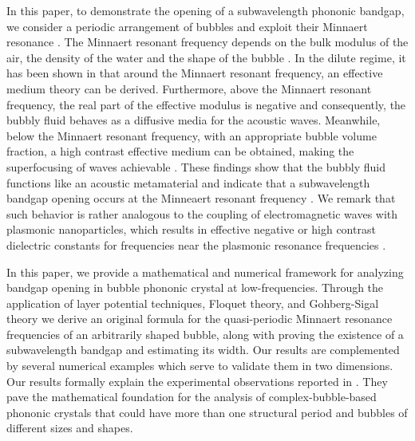 \documentclass[11pt]{article}
\numberwithin{equation}{section}
\newcommand\1{{\ensuremath {\mathds 1} }}
\begin{document}
In this paper, to demonstrate the opening of a subwavelength phononic bandgap, we consider a periodic arrangement of bubbles and exploit their Minnaert resonance \cite{Minnaert1933}.  
The Minnaert resonant frequency depends on the bulk modulus of the air,  the density of the water and the shape of the bubble \cite{Minnaert1933, Leroy2002, H3a}.  
In the dilute regime, it has been shown in \cite{Ammari_Hai} that around  the Minnaert resonant frequency, an effective medium theory can be derived. Furthermore, {above} the Minnaert resonant frequency, the real part of the effective {{modulus}} is negative and consequently, the bubbly fluid behaves as a diffusive media for the acoustic waves. 
Meanwhile, below the Minnaert resonant frequency, with an appropriate bubble volume fraction, a high contrast effective medium can be obtained, making the superfocusing of waves achievable \cite{Ammari2015_a}.  {These findings show that the bubbly fluid functions like an acoustic metamaterial and indicate that a subwavelength bandgap opening occurs at the Minneaert resonant frequency \cite{Leroy2009} .} We remark that such behavior is rather analogous to the coupling of electromagnetic waves with plasmonic nanoparticles, which results in effective negative or high contrast dielectric constants for frequencies near the plasmonic resonance frequencies \cite{matias1,matias2}.  

 
In this paper, we provide a mathematical and numerical framework for analyzing bandgap opening in bubble phononic crystal at low-frequencies. Through the application of layer potential techniques, Floquet theory, and Gohberg-Sigal theory we derive an original formula for the quasi-periodic Minnaert resonance frequencies of an arbitrarily shaped bubble, along with proving the existence of a subwavelength bandgap and estimating its width. Our results are complemented by several numerical examples which serve to validate them in two dimensions. Our results formally explain the experimental observations  reported  in \cite{Leroy2009}. They pave the mathematical foundation for the analysis of complex-bubble-based phononic crystals that could have more than one structural period and bubbles of different sizes and shapes.   
\end{document}
